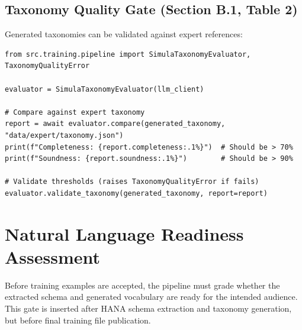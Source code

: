\subsection{Taxonomy Quality Gate (Section B.1, Table 2)}

Generated taxonomies can be validated against expert references:

\begin{lstlisting}[language=jsonx,caption={Taxonomy quality gate}]
from src.training.pipeline import SimulaTaxonomyEvaluator, TaxonomyQualityError

evaluator = SimulaTaxonomyEvaluator(llm_client)

# Compare against expert taxonomy
report = await evaluator.compare(generated_taxonomy, "data/expert/taxonomy.json")
print(f"Completeness: {report.completeness:.1%}")  # Should be > 70%
print(f"Soundness: {report.soundness:.1%}")        # Should be > 90%

# Validate thresholds (raises TaxonomyQualityError if fails)
evaluator.validate_taxonomy(generated_taxonomy, report=report)
\end{lstlisting}

\section{Natural Language Readiness Assessment}
\label{sec:nl-readiness-assessment}

Before training examples are accepted, the pipeline must grade whether the
extracted schema and generated vocabulary are ready for the intended audience.
This gate is inserted after HANA schema extraction and taxonomy generation, but
before final training file publication.

